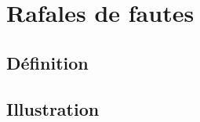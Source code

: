 \section{Rafales de fautes}
\label{sec:contribution_environnement_edla}

\subsection{Définition}
\subsection{Illustration}


